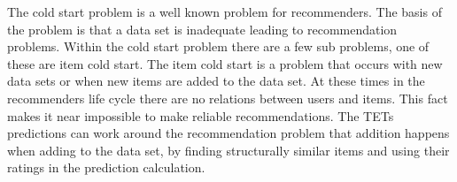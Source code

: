 The cold start problem is a well known problem for recommenders\cite{Ricci2015}\cite{saveski2014item}.
The basis of the problem is that a data set is 
inadequate leading to recommendation problems.
Within the cold start problem there are a few sub problems, one of these are item cold start.
The item cold start is a problem that occurs with new data sets or when new items are added to the data set.
At these times in the recommenders life cycle there are no relations between users and items.
This fact makes it near impossible to make reliable recommendations.
The TETs predictions can work around the recommendation problem that addition happens when adding to the data set, by finding structurally similar items and using their ratings in the prediction calculation.
